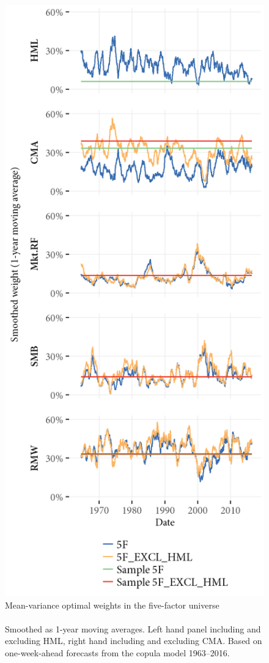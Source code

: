 \begin{figure}[htbp]
  \centering
  \footnotesize
  \renewcommand{\arraystretch}{1.2}
  \caption{Mean-variance optimal weights in the five-factor universe \\ \quad \\ Smoothed as 1-year moving averages. Left hand panel including and excluding HML, right hand including and excluding CMA. Based on one-week-ahead forecasts from the copula model 1963--2016.}
  \label{fig:mv_optimal_5}
  \includegraphics[scale = 1]{graphics/Weights_5F_EXCL_HML_5F.png}

\end{figure}

